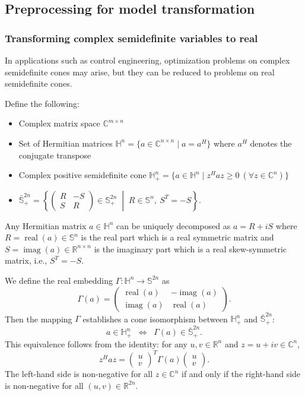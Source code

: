 \subsection{Preprocessing for model transformation}
\subsubsection{Transforming complex semidefinite variables to real}
In applications such as control engineering, optimization problems on complex semidefinite cones may arise, but they can be reduced to problems on real semidefinite cones.

Define the following:
\begin{itemize}
    \item Complex matrix space $\mathbb{C}^{m\times n}$
    \item Set of Hermitian matrices $\mathbb{H}^n=\{a \in \mathbb{C}^{n\times n} \mid a = a^H\}$ where $a^H$ denotes the conjugate transpose
    \item Complex positive semidefinite cone $\mathbb{H}^n_+=\{a \in \mathbb{H}^n \mid z^H a z \geq 0 ~(\forall z\in \mathbb{C}^n)\}$
    \item $\bar{\mathbb{S}}^{2n}_+ = \left\{\left(\begin{smallmatrix}
      R & -S\\
      S & R
  \end{smallmatrix} \right) \in \mathbb{S}^{2n}_+ \;\middle|\; R\in \mathbb{S}^n, ~ S^T=-S\right\}.$
\end{itemize}
Any Hermitian matrix $a \in \mathbb{H}^n$ can be uniquely decomposed as $a = R + iS$ where $R = \operatorname{real}(a) \in \mathbb{S}^n$ is the real part which is a real symmetric matrix and $S = \operatorname{imag}(a) \in \mathbb{R}^{n\times n}$ is the imaginary part which is a real skew-symmetric matrix, i.e., $S^T = -S$.

We define the real embedding $\Gamma: \mathbb{H}^n\to \mathbb{S}^{2n}$ as
\[
  \Gamma(a) 
  = \begin{pmatrix}
       \operatorname{real}(a) & -\operatorname{imag}(a) \\
       \operatorname{imag}(a) & \operatorname{real}(a)
     \end{pmatrix}.
\]
Then the mapping $\Gamma$ establishes a cone isomorphism between $\mathbb{H}^n_+$ and $\bar{\mathbb{S}}^{2n}_+$:
\[
  a\in \mathbb{H}^n_+
   \;\;\Longleftrightarrow\;\;
  \Gamma(a)\in \bar{\mathbb{S}}^{2n}_+.
\]
This equivalence follows from the identity: for any $u,v\in\mathbb{R}^n$ and $z=u+iv\in\mathbb{C}^n$,
\[
  z^H a z = 
  \begin{pmatrix}u\\ v\end{pmatrix}^T \Gamma(a) \begin{pmatrix}u\\ v\end{pmatrix}.
\]
The left-hand side is non-negative for all $z \in \mathbb{C}^n$ if and only if the right-hand side is non-negative for all $(u,v) \in \mathbb{R}^{2n}$.

